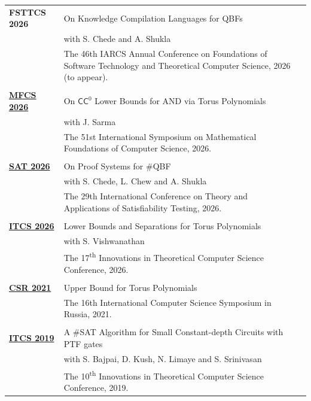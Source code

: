 \documentclass[a4paper,10pt]{article}
\begin{document}
\begin{longtable}{p{2.5cm}|p{11cm}l}
  {{\bf FSTTCS 2026}} & On Knowledge Compilation Languages for QBFs \\
                 & with S. Chede and A. Shukla \\
                 & The 46th IARCS Annual Conference on Foundations of Software Technology and Theoretical Computer Science, 2026 (to appear). \\
  \\
  \href{https://drops.dagstuhl.de/entities/document/10.4230/LIPIcs.MFCS.2026.62}{{\bf MFCS 2026}} & On $\mathsf{CC}^0$ Lower Bounds for AND via Torus Polynomials \\
                 & with J. Sarma \\
                 & The 51st International Symposium on Mathematical Foundations of Computer Science, 2026. \\
  \\
  \href{https://drops.dagstuhl.de/entities/document/10.4230/LIPIcs.SAT.2026.32}{{\bf SAT 2026}} & On Proof Systems for \#QBF \\
                 & with S. Chede, L. Chew and A. Shukla \\
                 & The 29th International Conference on Theory and Applications of Satisfiability Testing, 2026. \\
  \\
  \href{https://drops.dagstuhl.de/storage/00lipics/lipics-vol362-itcs2026/LIPIcs.ITCS.2026.88/LIPIcs.ITCS.2026.88.pdf}{{\bf ITCS 2026}} & Lower Bounds and Separations for Torus Polynomials \\
                                                                  & with S. Vishwanathan \\
                                                                  & The 17\textsuperscript{th} Innovations in Theoretical Computer Science Conference, 2026. \\
  \\
  \href{https://link.springer.com/chapter/10.1007/978-3-030-79416-3_15}{{\bf CSR 2021}} & Upper Bound for Torus Polynomials \\
  & The 16th International Computer Science Symposium in Russia, 2021. \\
  \\
  \href{https://drops.dagstuhl.de/opus/volltexte/2018/10101/}{{\bf ITCS 2019}} & A \#SAT Algorithm for Small Constant-depth Circuits with PTF gates \\
  & with S. Bajpai, D. Kush, N. Limaye and S. Srinivasan \\
  & The 10\textsuperscript{th} Innovations in Theoretical Computer Science Conference, 2019.
\end{longtable}
\end{document}
